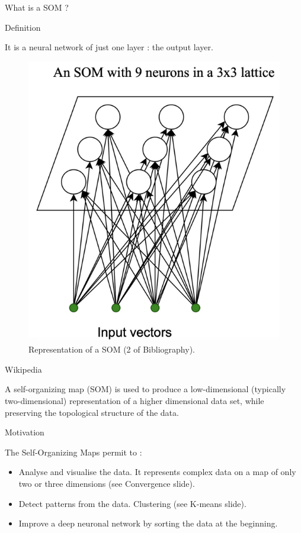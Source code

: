\documentclass{beamer}
\begin{document}
	\begin{frame}{What is a SOM ?}
		
		\begin{block}{Definition}
 
It is a neural network of just one layer : the output layer.
 	
			
		\begin{center}
			
			\begin{figure}[h]
			
				\includegraphics[width=0.3\linewidth]{pics/som_example_diapo_1.png}
				\caption{Representation of a SOM (2 of Bibliography).}
			\end{figure}
		\end{center}

		\end{block}		

		\begin{block}{Wikipedia}

A self-organizing map (SOM) is used to produce a low-dimensional (typically two-dimensional) representation of a higher dimensional data set, while preserving the topological structure of the data. 
		\end{block}
	\end{frame}
	
	
	\begin{frame}{Motivation}

		The Self-Organizing Maps permit to : 

		\begin{itemize}
		
			\item Analyse and visualise the data. It represents complex data on a map of only two or three dimensions (see Convergence slide).

			\item Detect patterns from the data. Clustering (see K-means slide).

			\item Improve a deep neuronal network by sorting the data at the beginning.

		\end{itemize}


	\end{frame}
	
\end{document}
